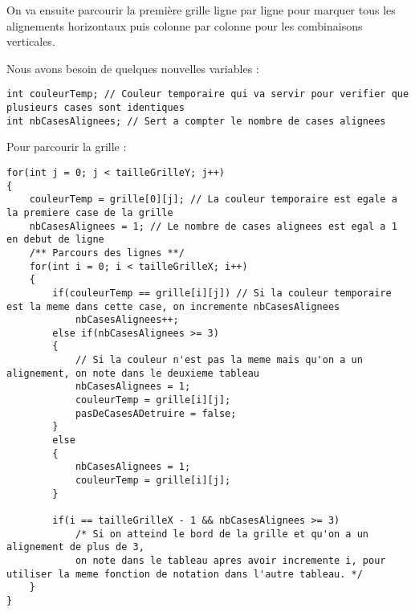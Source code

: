 \begin{itemize}
On va ensuite parcourir la première grille ligne par ligne pour marquer tous les alignements horizontaux puis colonne par colonne pour les combinaisons verticales.

Nous avons besoin de quelques nouvelles variables :

\begin{lstlisting}
int couleurTemp; // Couleur temporaire qui va servir pour verifier que plusieurs cases sont identiques
int nbCasesAlignees; // Sert a compter le nombre de cases alignees
\end{lstlisting}

Pour parcourir la grille :

\begin{lstlisting}
for(int j = 0; j < tailleGrilleY; j++)
{
	couleurTemp = grille[0][j]; // La couleur temporaire est egale a la premiere case de la grille
	nbCasesAlignees = 1; // Le nombre de cases alignees est egal a 1 en debut de ligne
	/** Parcours des lignes **/
	for(int i = 0; i < tailleGrilleX; i++)
	{
		if(couleurTemp == grille[i][j]) // Si la couleur temporaire est la meme dans cette case, on incremente nbCasesAlignees
			nbCasesAlignees++;
		else if(nbCasesAlignees >= 3)
		{
			// Si la couleur n'est pas la meme mais qu'on a un alignement, on note dans le deuxieme tableau
			nbCasesAlignees = 1;
			couleurTemp = grille[i][j];
			pasDeCasesADetruire = false;
		}
		else
		{
			nbCasesAlignees = 1;
			couleurTemp = grille[i][j];
		}

		if(i == tailleGrilleX - 1 && nbCasesAlignees >= 3) 
			/* Si on atteind le bord de la grille et qu'on a un alignement de plus de 3,
			on note dans le tableau apres avoir incremente i, pour utiliser la meme fonction de notation dans l'autre tableau. */
	}
} 
\end{lstlisting}

\end{itemize}
